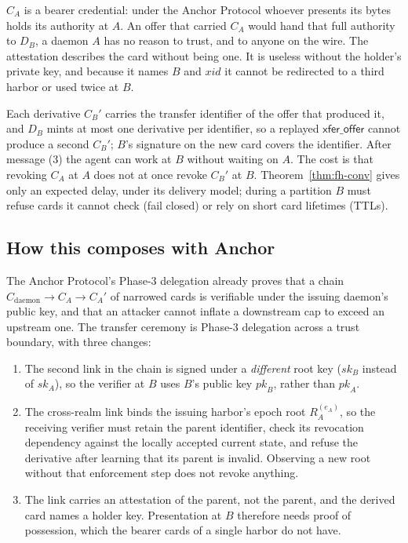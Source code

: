 \documentclass[11pt,a4paper]{article}
\theoremstyle{definition}
\theoremstyle{remark}
\begin{document}
$C_A$ is a bearer credential: under the Anchor Protocol whoever presents its bytes holds its authority at $A$. An offer that carried $C_A$ would hand that full authority to $D_B$, a daemon $A$ has no reason to trust, and to anyone on the wire. The attestation describes the card without being one. It is useless without the holder's private key, and because it names $B$ and $\mathit{xid}$ it cannot be redirected to a third harbor or used twice at $B$.

Each derivative $C_B'$ carries the transfer identifier of the offer that produced it, and $D_B$ mints at most one derivative per identifier, so a replayed $\mathsf{xfer\_offer}$ cannot produce a second $C_B'$; $B$'s signature on the new card covers the identifier. After message (3) the agent can work at $B$ without waiting on $A$. The cost is that revoking $C_A$ at $A$ does not at once revoke $C_B'$ at $B$. Theorem~\ref{thm:fh-conv} gives only an expected delay, under its delivery model; during a partition $B$ must refuse cards it cannot check (fail closed) or rely on short card lifetimes (TTLs).

\subsection{How this composes with Anchor}\label{sec:fh-xfer-compose}

The Anchor Protocol's Phase-3 delegation already proves that a chain $C_{\text{daemon}} \to C_A \to C_A'$ of narrowed cards is verifiable under the issuing daemon's public key, and that an attacker cannot inflate a downstream cap to exceed an upstream one. The transfer ceremony is Phase-3 delegation across a trust boundary, with three changes:

\begin{enumerate}[nosep]
\item The second link in the chain is signed under a \emph{different} root key ($\mathit{sk}_B$ instead of $\mathit{sk}_A$), so the verifier at $B$ uses $B$'s public key $\mathit{pk}_B$, rather than $\mathit{pk}_A$.
\item The cross-realm link binds the issuing harbor's epoch root $R_A^{(e_A)}$, so the receiving verifier must retain the parent identifier, check its
revocation dependency against the locally accepted current state, and refuse
the derivative after learning that its parent is invalid. Observing a new
root without that enforcement step does not revoke anything.
\item The link carries an attestation of the parent, not the parent, and the derived card names a holder key. Presentation at $B$ therefore needs proof of possession, which the bearer cards of a single harbor do not have.
\end{enumerate}
\end{document}
